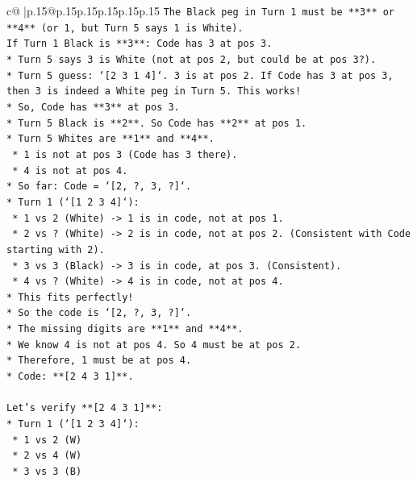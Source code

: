 \documentclass{article}
\begin{document}
{\begin{supertabular}{c@{$\;$}|p{.15\linewidth}@{}p{.15\linewidth}p{.15\linewidth}p{.15\linewidth}p{.15\linewidth}p{.15\linewidth}}
{{{\texttt{The Black peg in Turn 1 must be **3** or **4** (or 1, but Turn 5 says 1 is White).} \\
\texttt{If Turn 1 Black is **3**: Code has 3 at pos 3.} \\
\texttt{*   Turn 5 says 3 is White (not at pos 2, but could be at pos 3?).} \\
\texttt{*   Turn 5 guess: `{[}2 3 1 4{]}`. 3 is at pos 2. If Code has 3 at pos 3, then 3 is indeed a White peg in Turn 5. This works!} \\
\texttt{*   So, Code has **3** at pos 3.} \\
\texttt{*   Turn 5 Black is **2**. So Code has **2** at pos 1.} \\
\texttt{*   Turn 5 Whites are **1** and **4**.} \\
\texttt{    *   1 is not at pos 3 (Code has 3 there).} \\
\texttt{    *   4 is not at pos 4.} \\
\texttt{*   So far: Code = `{[}2, ?, 3, ?{]}`.} \\
\texttt{*   Turn 1 (`{[}1 2 3 4{]}`):} \\
\texttt{    *   1 vs 2 (White) {-}> 1 is in code, not at pos 1.} \\
\texttt{    *   2 vs ? (White) {-}> 2 is in code, not at pos 2. (Consistent with Code starting with 2).} \\
\texttt{    *   3 vs 3 (Black) {-}> 3 is in code, at pos 3. (Consistent).} \\
\texttt{    *   4 vs ? (White) {-}> 4 is in code, not at pos 4.} \\
\texttt{*   This fits perfectly!} \\
\texttt{*   So the code is `{[}2, ?, 3, ?{]}`.} \\
\texttt{*   The missing digits are **1** and **4**.} \\
\texttt{*   We know 4 is not at pos 4. So 4 must be at pos 2.} \\
\texttt{*   Therefore, 1 must be at pos 4.} \\
\texttt{*   Code: **{[}2 4 3 1{]}**.} \\
\\ 
\texttt{Let's verify **{[}2 4 3 1{]}**:} \\
\texttt{*   Turn 1 (`{[}1 2 3 4{]}`):} \\
\texttt{    *   1 vs 2 (W)} \\
\texttt{    *   2 vs 4 (W)} \\
\texttt{    *   3 vs 3 (B)} \\
}}}
\end{supertabular}}
\end{document}
